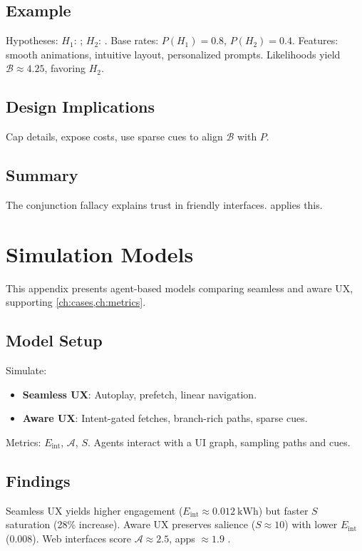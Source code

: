 \documentclass[openany]{book}
\newcommand{\Sent}{S} %
\newcommand{\Eint}{E_{\mathrm{int}}} %
\newcommand{\Auton}{\mathcal{A}} %
\newcommand{\kWh}{\mathrm{kWh}}
\begin{document}
{{{{{{{{{{{{\section{Example}
\label{sec:conj-example}
Hypotheses: \(H_1\): ; \(H_2\): . Base rates: \(P(H_1) = 0.8\), \(P(H_2) = 0.4\). Features: smooth animations, intuitive layout, personalized prompts. Likelihoods yield \(\mathcal{B} \approx 4.25\), favoring \(H_2\).

\section{Design Implications}
\label{sec:conj-implications}
Cap details, expose costs, use sparse cues to align \(\mathcal{B}\) with \(P\).

\section{Summary}
The conjunction fallacy explains trust in friendly interfaces.  applies this.

\chapter{Simulation Models}
\label{app:simulation}

This appendix presents agent-based models comparing seamless and aware UX, supporting \cref{ch:cases,ch:metrics}.

\section{Model Setup}
\label{sec:sim-setup}
Simulate:
\begin{itemize}
  \item \textbf{Seamless UX}: Autoplay, prefetch, linear navigation.
  \item \textbf{Aware UX}: Intent-gated fetches, branch-rich paths, sparse cues.
\end{itemize}
Metrics: \(\Eint\), \(\Auton\), \(\Sent\). Agents interact with a UI graph, sampling paths and cues.

\section{Findings}
\label{sec:sim-findings}
Seamless UX yields higher engagement (\(\Eint \approx \SI{0.012}{\kWh}\)) but faster \(\Sent\) saturation (28\% increase). Aware UX preserves salience (\(\Sent \approx 10\)) with lower \(\Eint\) (\SI{0.008}{\kWh}). Web interfaces score \(\Auton \approx 2.5\), apps \(\approx 1.9\) \citep{doctorow2022}.

}}}}}}}}}}}}
\end{document}

